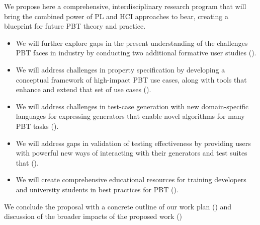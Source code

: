 We propose here a comprehensive, interdisciplinary research program that will
bring the combined power of PL and HCI approaches to bear, creating a
blueprint for future PBT theory and practice.
\begin{itemize}[noitemsep]
  \item We will further explore gaps in the present understanding of the
  challenges PBT faces in
  industry by conducting two\iflater{}\fi{} additional formative user
  studies ().
  \item We will address challenges in property specification by developing a
  conceptual framework of high-impact PBT use cases, along with tools that
  enhance and extend that set of use cases ().
  \item We will address challenges in test-case generation with new
  domain-specific languages for expressing generators that enable novel
  algorithms for many PBT tasks (). 
  \item We will address gaps in validation of testing effectiveness by providing
  users with powerful new ways of interacting with their generators and test
  suites that ().
  \item We will create comprehensive educational resources for training developers and
  university students in best practices for PBT ().
\end{itemize}
We conclude the proposal with a concrete outline of our work plan
() and discussion of the broader impacts of the
proposed work ()

